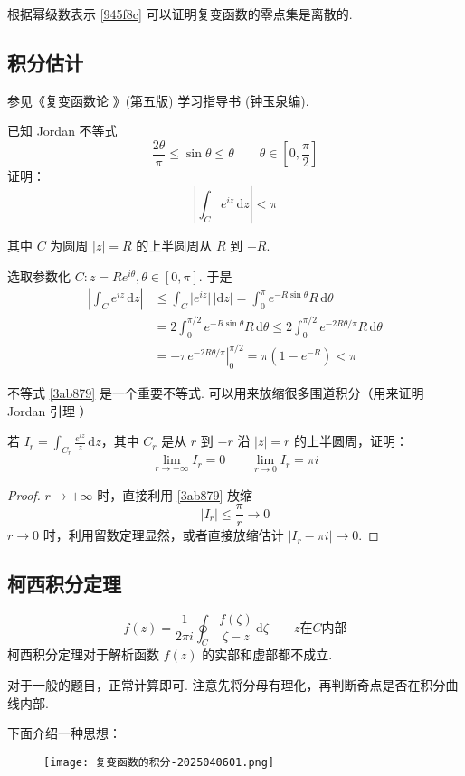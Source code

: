 根据幂级数表示 \cref{945f8c}  可以证明复变函数的零点集是离散的.

\subsection{积分估计}

参见《复变函数论 》(第五版) 学习指导书 (钟玉泉编).

已知 Jordan 不等式
\[
\frac{2\theta}{\pi}\leq \sin\theta\leq \theta \qquad \theta\in\left[ 0,\frac{\pi}{2} \right]
\]
证明：
\begin{equation}
\left\lvert  \int_{C}^{} e^{ iz }  \, \mathrm{d}z   \right\rvert <\pi
\label{3ab879}
\end{equation}

其中 $C$ 为圆周 $\lvert z \rvert=R$ 的上半圆周从 $R$ 到 $-R$.

选取参数化 $C:z=R e^{ i\theta },\theta\in[0,\pi]$. 于是
\[
\begin{aligned}
\left\lvert  \int_{C}^{} e^{ iz } \, \mathrm{d}z   \right\rvert  & \leq \int_{C}^{} \lvert e^{ iz } \rvert  \, \lvert \mathrm{d}z \rvert  =\int_{0}^{\pi} e^{ -R\sin\theta }R \, \mathrm{d}\theta\\
 & =2\int_{0}^{\pi/2 } e^{ -R\sin\theta }R \, \mathrm{d}\theta \leq 2\int_{0}^{\pi/2 } e^{ -2R\theta/\pi  }R \, \mathrm{d}\theta \\
 & =-\pi \left.e^{ -2R\theta/\pi }\right|^{\pi/2 }_{0}=\pi (1-e^{ -R })<\pi 
\end{aligned}
\]
\begin{remark}
不等式 \cref{3ab879}  是一个重要不等式. 可以用来放缩很多围道积分（用来证明 Jordan 引理 ）
\end{remark}
\begin{exercise}
若 $I_{r}=\int_{C_{r}}^{} \frac{e^{ iz }}{z} \, \mathrm{d}z$，其中 $C_{r}$ 是从 $r$ 到 $-r$ 沿 $\lvert z \rvert=r$ 的上半圆周，证明：
\[
\lim_{ r \to +\infty } I_{r}=0\qquad \lim_{ r \to 0 } I_{r}=\pi i
\]
\end{exercise}
\begin{proof}
$r\to +\infty$ 时，直接利用 \cref{3ab879} 放缩
\[
\lvert I_{r} \rvert \leq \frac{\pi }{r}\to0
\]
$r\to0$ 时，利用留数定理显然，或者直接放缩估计 $\lvert I_{r}-\pi i \rvert\to0$.

\end{proof}

\subsection{柯西积分定理}
\[
f(z)=\frac{1}{2\pi i}\oint_{C} \frac{f(\zeta)}{\zeta-z} \, \mathrm{d}\zeta \qquad z\text{在}C\text{内部}  
\]
柯西积分定理对于解析函数 $f(z)$ 的实部和虚部都不成立.

对于一般的题目，正常计算即可. 注意先将分母有理化，再判断奇点是否在积分曲线内部.

下面介绍一种思想：
\begin{figure}[H]
\centering
\texttt{[image: 复变函数的积分-2025040601.png]}
\label{}
\end{figure}
